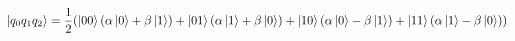 \documentclass[preview]{standalone}
\begin{document}
\begin{align*}
\ket{q_0 q_1 q_2}= \frac{1}{2}( \ket{00}(\alpha \ket{0} + \beta \ket{1}) + \ket{01}( \alpha \ket{1} + \beta \ket{0}) +\ket{10} (\alpha \ket{0} - \beta \ket{1}) +\ket{11}(\alpha \ket{1} - \beta \ket{0}))
\end{align*}
\end{document}
